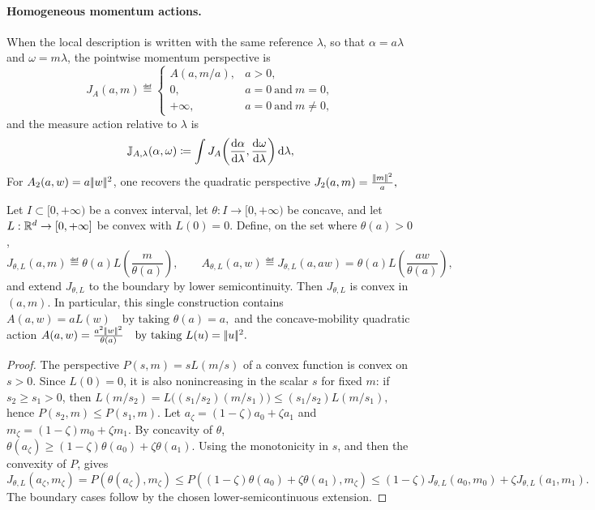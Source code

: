 \paragraph{Homogeneous momentum actions.}\label{rem-generalized-bb}
When the local description is written with the same reference $\lambda$, so that $\alpha=a\lambda$ and $\omega=m\lambda$, the pointwise momentum perspective is
\begin{equation}\label{eq-general-momentum-perspective}
J_A(a,m)
\eqdef
\begin{cases}
A(a,m/a), & a>0,\\
0, & a=0\ \text{and}\ m=0,\\
+\infty, & a=0\ \text{and}\ m\neq0,
\end{cases}
\end{equation}
and the measure action relative to $\lambda$ is
\begin{equation}\label{eq-general-measure-momentum-action}
\mathbb J_{A,\lambda}(\alpha,\omega)
\coloneqq
\int
J_A\!\left(
\frac{\mathrm{d}\alpha}{\mathrm{d}\lambda},
\frac{\mathrm{d}\omega}{\mathrm{d}\lambda}
\right)\mathrm{d}\lambda,
\end{equation}
For $A_2(a,w)=a|\!| w |\!|^2$, one recovers the quadratic perspective
\(J_2(a,m)=\frac{|\!| m |\!|^2}{a},\)
\begin{prop}\label{prop-momentum-perspective-convexity}
Let \(I\subset[0,+\infty)\) be a convex interval, let \(\theta:I\to[0,+\infty)\) be concave, and let \(L:\mathbb{R}^d\to[0,+\infty]\) be convex with \(L(0)=0\). Define, on the set where \(\theta(a)>0\),
\begin{equation}\label{eq-concave-mobility-perspective}
J_{\theta,L}(a,m)
\eqdef
\theta(a)L\!\left(\frac{m}{\theta(a)}\right),
\qquad
A_{\theta,L}(a,w)
\eqdef
J_{\theta,L}(a,aw)
=
\theta(a)L\!\left(\frac{aw}{\theta(a)}\right),
\end{equation}
and extend \(J_{\theta,L}\) to the boundary by lower semicontinuity. Then \(J_{\theta,L}\) is convex in \((a,m)\). In particular, this single construction contains
\(A(a,w)=aL(w) \quad\text{by taking }\theta(a)=a,\)
and the concave-mobility quadratic action
\(A(a,w)=\frac{a^2|\!| w |\!|^2}{\theta(a)} \quad\text{by taking }L(u)=|\!| u |\!|^2.\)
\end{prop}
\begin{proof}
The perspective \(P(s,m)=sL(m/s)\) of a convex function is convex on \(s>0\). Since \(L(0)=0\), it is also nonincreasing in the scalar \(s\) for fixed \(m\): if \(s_2\geq s_1>0\), then
\(L(m/s_2) = L\big((s_1/s_2)(m/s_1)\big) \leq (s_1/s_2)L(m/s_1),\)
hence \(P(s_2,m)\leq P(s_1,m)\). Let \(a_\zeta=(1-\zeta)a_0+\zeta a_1\) and \(m_\zeta=(1-\zeta)m_0+\zeta m_1\). By concavity of \(\theta\), \(\theta(a_\zeta) \geq (1-\zeta)\theta(a_0)+\zeta\theta(a_1).\)
Using the monotonicity in \(s\), and then the convexity of \(P\), gives
\[
J_{\theta,L}(a_\zeta,m_\zeta)
=
P(\theta(a_\zeta),m_\zeta)
\leq
P((1-\zeta)\theta(a_0)+\zeta\theta(a_1),m_\zeta)
\leq
(1-\zeta)J_{\theta,L}(a_0,m_0)+\zeta J_{\theta,L}(a_1,m_1).
\]
The boundary cases follow by the chosen lower-semicontinuous extension.
\end{proof}
